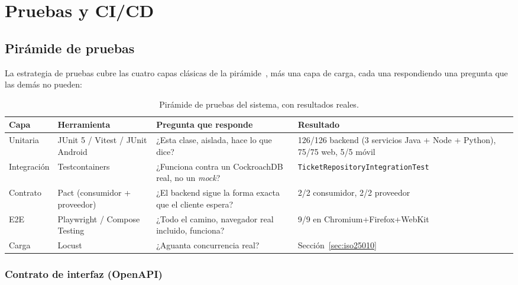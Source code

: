 \section{Pruebas y CI/CD}
\label{sec:pruebas-cicd}

\subsection{Pirámide de pruebas}

La estrategia de pruebas cubre las cuatro capas clásicas de la pirámide~\cite{ammann2016testing},
más una capa de carga, cada una respondiendo una pregunta que las demás no pueden:

\begin{table}[H]
\centering
\small
\caption{Pirámide de pruebas del sistema, con resultados reales.}
\label{tab:piramide}
\begin{tabular}{@{}p{2.3cm}p{3.4cm}p{4.2cm}p{3.2cm}@{}}
\toprule
\textbf{Capa} & \textbf{Herramienta} & \textbf{Pregunta que responde} & \textbf{Resultado} \\
\midrule
Unitaria & JUnit 5 / Vitest / JUnit Android & ¿Esta clase, aislada, hace lo que dice? & 126/126 backend (3 servicios Java + Node + Python), 75/75 web, 5/5 móvil \\
Integración & Testcontainers & ¿Funciona contra un CockroachDB real, no un \emph{mock}? & \texttt{TicketRepositoryIntegrationTest} \\
Contrato & Pact (consumidor + proveedor) & ¿El backend sigue la forma exacta que el cliente espera? & 2/2 consumidor, 2/2 proveedor \\
E2E & Playwright / Compose Testing & ¿Todo el camino, navegador real incluido, funciona? & 9/9 en Chromium+Firefox+WebKit \\
Carga & Locust & ¿Aguanta concurrencia real? & Sección~\ref{sec:iso25010} \\
\bottomrule
\end{tabular}
\end{table}

\subsubsection{Contrato de interfaz (OpenAPI)}
\label{sec:contrato-openapi}

